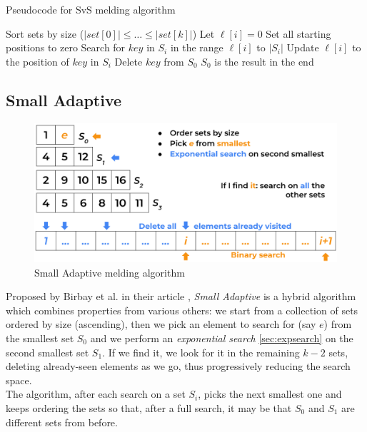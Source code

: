 \begin{algorithm}
    \captionsetup{labelsep=newline}
    \caption{Pseudocode for SvS melding algorithm \label{alg:svs}}
    \begin{algorithmic}[1]
        \State Sort sets by size \big($\big|set[0]\big| \leq \ldots \leq \big|set[k]\big|$\big)
            \State Let $\ell[i]=0$ \Comment Set all starting positions to zero
        \EndFor
                \State Search for $key$ in $S_i$ in the range $\ell[i]$ to $|S_i|$
                \State Update $\ell[i]$ to the position of $key$ in $S_i$
                    \State Delete $key$ from $S_0$ \Comment $S_0$ is the result in the end
                \EndIf
            \EndFor
        \EndFor
    \end{algorithmic}
\end{algorithm}

\subsection{Small Adaptive \label{sec:smalladaptive}}

\begin{figure}[H] 
    \begin{center}
        \includegraphics[width=.8\textwidth]{imgs/smalladaptive.png}
        \caption{Small Adaptive melding algorithm \label{fig:smalladaptive}}
    \end{center}
\end{figure}

Proposed by Birbay et al. in their article \citep{birbay_ortiz}, \textit{Small Adaptive} is a hybrid algorithm which combines properties from various others: we start from a collection of sets ordered by size (ascending), then we pick an element to search for (say $e$) from the smallest set $S_0$ and we perform an \textit{exponential search} \ref{sec:expsearch} on the second smallest set $S_1$. If we find it, we look for it in the remaining $k-2$ sets, deleting already-seen elements as we go, thus progressively reducing the search space. \\
The algorithm, after each search on a set $S_i$, picks the next smallest one and keeps ordering the sets so that, after a full search, it may be that $S_0$ and $S_1$ are different sets from before.

